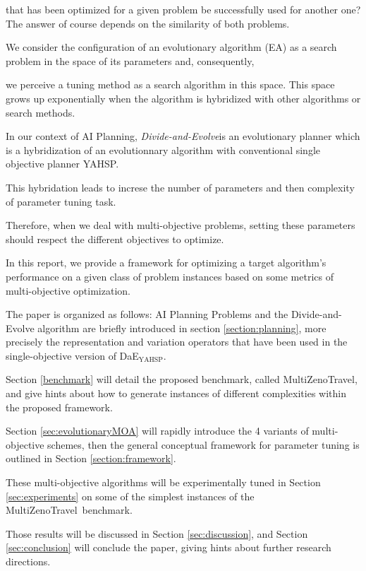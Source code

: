 \documentclass[a4paper,10pt]{article}
\def\dae{{\em Divide-and-Evolve}}
\def\DAEYAHSP{{\sc DaE$_{\text{YAHSP}}$}}
\def\MULTIZENO{{\sc MultiZenoTravel}}
\begin{document}
that has been optimized for a given problem be successfully used for another one? The answer of course depends on the similarity of both problems.

We consider the configuration of an evolutionary algorithm (EA) as a search problem in the space of its parameters and, consequently, 

we perceive a tuning method as a search algorithm in this space. This space grows up exponentially when the algorithm is hybridized with other algorithms or search methods.

In our context of AI Planning, \dae is an evolutionary planner which is a hybridization of an evolutionnary algorithm with conventional single objective planner  YAHSP.

This hybridation leads to increse the number of parameters and then complexity of parameter tuning task. 

Therefore, when  we deal with multi-objective problems, setting these parameters should respect  the different objectives to optimize. 

In this report, we  provide a framework for optimizing a target algorithm’s performance on a given class of problem instances based on some metrics of multi-objective optimization.
  
The paper is organized as follows: AI Planning Problems and the Divide-and-Evolve algorithm are briefly introduced in section  \ref{section:planning}, more precisely the representation and variation operators that have been used in the single-objective version of \DAEYAHSP. 
 
Section \ref{benchmark} will detail the proposed benchmark, called \MULTIZENO, and give hints about how to generate instances of different complexities within the proposed framework.

Section \ref{sec:evolutionaryMOA} will rapidly introduce the 4 variants of multi-objective schemes, then the general conceptual framework for parameter tuning is outlined in Section \ref{section:framework}.

These multi-objective algorithms will be experimentally tuned in Section \ref{sec:experiments} on some of the simplest instances of the \MULTIZENO\ benchmark. 

Those results will be discussed in Section \ref{sec:discussion}, and Section \ref{sec:conclusion} will conclude the paper, giving  hints about further research directions.

 
\end{document}
